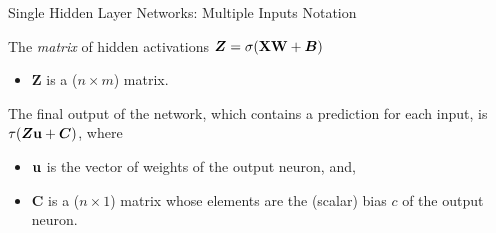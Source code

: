 \documentclass[11pt,compress,t,notes=noshow, xcolor=table]{beamer}
\begin{document}
\begin{framei}[sep=L]{Single Hidden Layer Networks: Multiple Inputs Notation}

\item The \textit{matrix} of hidden activations $\bm{Z} = \sigma(\mathbf{X}\mathbf{W} + \bm{B})$
    \begin{itemize}
      \item $\bm{Z}$ is a ($n \times m$) matrix.
    \end{itemize}
    
    \item The final output of the network, which contains a prediction for each input, is $\tau(\bm{Z}\mathbf{u} + \bm{C})$, where
      \begin{itemize}

        \item $\mathbf{u}$ is the vector of weights of the output neuron, and,

        \item $\bm{C}$ is a ($n \times 1$) matrix whose elements are the (scalar) bias $c$ of the output neuron.
      \end{itemize}

\end{framei}
\endlecture
\end{document}
